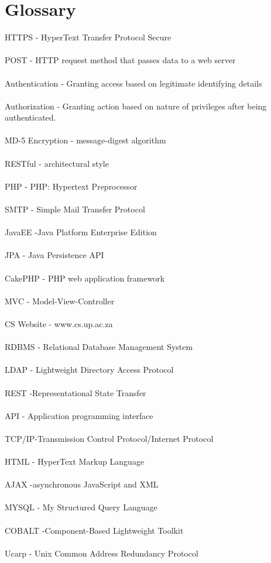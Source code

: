 \documentclass[a4paper,12pt]{report}
\begin{document}
\section{Glossary}
HTTPS - HyperText Transfer Protocol Secure \\ \\
POST - HTTP request method that passes data to a web server \\ \\
Authentication - Granting access based on legitimate identifying details \\ \\
Authorization - Granting action based on nature of privileges after being authenticated. \\ \\
MD-5 Encryption - message-digest algorithm \\ \\
RESTful - architectural style \\ \\
PHP - PHP: Hypertext Preprocessor \\ \\
SMTP - Simple Mail Transfer Protocol \\ \\
JavaEE -Java Platform Enterprise Edition \\ \\
JPA - Java Persistence API \\ \\
CakePHP - PHP web application framework \\ \\
MVC - Model-View-Controller \\ \\
CS Website - www.cs.up.ac.za \\ \\
RDBMS - Relational Database Management System \\ \\
LDAP - Lightweight Directory Access Protocol \\ \\
REST -Representational State Transfer \\ \\
API - Application programming interface \\ \\
TCP/IP-Transmission Control Protocol/Internet Protocol \\ \\
HTML - HyperText Markup Language \\ \\
AJAX -asynchronous JavaScript and XML \\ \\
MYSQL - My Structured Query Language \\ \\
COBALT -Component-Based Lightweight Toolkit \\ \\
Ucarp - Unix Common Address Redundancy Protocol \\ \\
\end{document}
